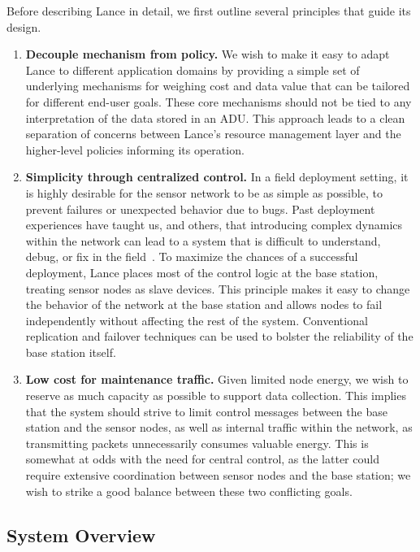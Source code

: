 Before describing Lance in detail, we first outline several principles 
that guide its design. 

\begin{enumerate}

\item \textbf{Decouple mechanism from policy.} We wish to make it easy to
adapt Lance to different application domains by providing a simple set of
underlying mechanisms for weighing cost and data value that can be tailored
for different end-user goals. These core mechanisms should not be tied to any
interpretation of the data stored in an ADU. This approach leads to a clean
separation of concerns between Lance's resource management layer and the
higher-level policies informing its operation.

\item \textbf{Simplicity through centralized control.} In a field deployment
setting, it is highly desirable for the sensor network to be as simple as
possible, to prevent failures or unexpected behavior due to bugs. Past
deployment experiences have taught us, and others, that introducing complex
dynamics within the network can lead to a system that is difficult to
understand, debug, or fix in the field~\cite{volcano-osdi06,volcano-ewsn05}.
To maximize the chances of a successful deployment, Lance places most of the
control logic at the base station, treating sensor nodes as slave devices.
This principle makes it easy to change the behavior of the network at the
base station and allows nodes to fail independently without affecting the
rest of the system. Conventional replication and failover techniques can be
used to bolster the reliability of the base station itself.

\item \textbf{Low cost for maintenance traffic.} Given limited node energy,
we wish to reserve as much capacity as possible to support data collection.
This implies that the system should strive to limit control messages between
the base station and the sensor nodes, as well as internal traffic within the
network, as transmitting packets unnecessarily consumes valuable energy.
This is somewhat at odds with the need for central control, as the latter
could require extensive coordination between sensor nodes and the base
station; we wish to strike a good balance between these two conflicting
goals.

\end{enumerate}

\subsection{System Overview}

